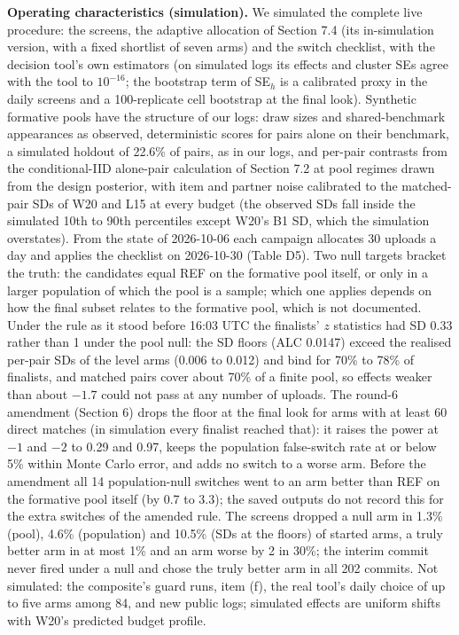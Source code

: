 \documentclass[
]{article}
\begin{document}
\textbf{Operating characteristics (simulation).} We simulated the
complete live procedure: the screens, the adaptive allocation of Section
7.4 (its in-simulation version, with a fixed shortlist of seven arms)
and the switch checklist, with the decision tool's own estimators (on
simulated logs its effects and cluster SEs agree with the tool to
\(10^{-16}\); the bootstrap term of SE\(_h\) is a calibrated proxy in
the daily screens and a 100-replicate cell bootstrap at the final look).
Synthetic formative pools have the structure of our logs: draw sizes and
shared-benchmark appearances as observed, deterministic scores for pairs
alone on their benchmark, a simulated holdout of 22.6\% of pairs, as in
our logs, and per-pair contrasts from the conditional-IID alone-pair
calculation of Section 7.2 at pool regimes drawn from the design
posterior, with item and partner noise calibrated to the matched-pair
SDs of W20 and L15 at every budget (the observed SDs fall inside the
simulated 10th to 90th percentiles except W20's B1 SD, which the
simulation overstates). From the state of 2026-10-06 each campaign
allocates 30 uploads a day and applies the checklist on 2026-10-30
(Table D5). Two null targets bracket the truth: the candidates equal REF
on the formative pool itself, or only in a larger population of which
the pool is a sample; which one applies depends on how the final subset
relates to the formative pool, which is not documented. Under the rule
as it stood before 16:03 UTC the finalists' \(z\) statistics had SD 0.33
rather than 1 under the pool null: the SD floors (ALC 0.0147) exceed the
realised per-pair SDs of the level arms (0.006 to 0.012) and bind for
70\% to 78\% of finalists, and matched pairs cover about 70\% of a
finite pool, so effects weaker than about \(-1.7\) could not pass at any
number of uploads. The round-6 amendment (Section 6) drops the floor at
the final look for arms with at least 60 direct matches (in simulation
every finalist reached that): it raises the power at \(-1\) and \(-2\)
to 0.29 and 0.97, keeps the population false-switch rate at or below 5\%
within Monte Carlo error, and adds no switch to a worse arm. Before the
amendment all 14 population-null switches went to an arm better than REF
on the formative pool itself (by 0.7 to 3.3); the saved outputs do not
record this for the extra switches of the amended rule. The screens
dropped a null arm in 1.3\% (pool), 4.6\% (population) and 10.5\% (SDs
at the floors) of started arms, a truly better arm in at most 1\% and an
arm worse by 2 in 30\%; the interim commit never fired under a null and
chose the truly better arm in all 202 commits. Not simulated: the
composite's guard runs, item (f), the real tool's daily choice of up to
five arms among 84, and new public logs; simulated effects are uniform
shifts with W20's predicted budget profile.
\end{document}
